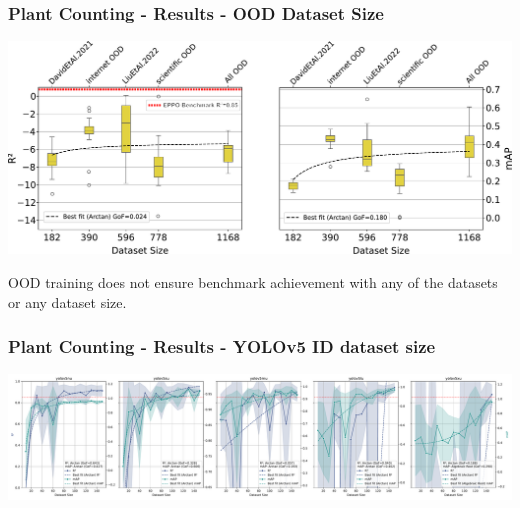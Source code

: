 \documentclass[aspectratio=43]{beamer}
\begin{document}
\begin{frame}
    \frametitle{Plant Counting - Results - OOD Dataset Size}
    \begin{center}
        \includegraphics[width=1\textwidth]{Imgs/metrics_OOD_datasets.pdf}
    \end{center}
    \small OOD training does not ensure benchmark achievement with any of the datasets or any dataset size.
\end{frame}

\begin{frame}
    \frametitle{Plant Counting - Results - YOLOv5 ID dataset size}
    \begin{center}
        \includegraphics[width=1\textwidth]{Imgs/r2_ap_vs_dataset_size_yolov5.pdf}
    \end{center}
\end{frame}
\end{document}
